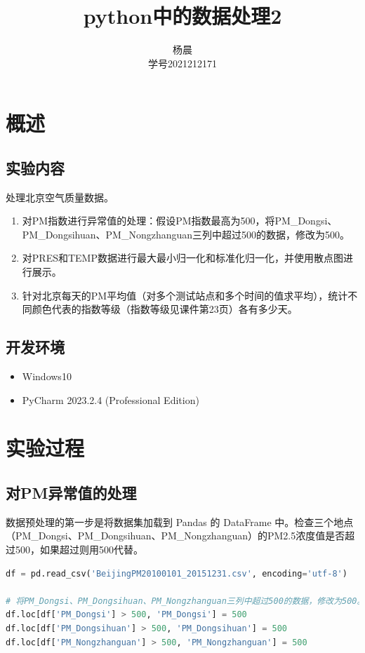 \documentclass[lang=cn,11pt,a4paper]{elegantpaper}
\title{python中的数据处理2}
\author{杨晨 \\学号2021212171}
\institute{北京邮电大学 计算机学院}
\date{\zhtoday}
\begin{document}
\maketitle

\section{概述}

\subsection{实验内容}

处理北京空气质量数据。

\begin{enumerate}
    \item 对PM指数进行异常值的处理：假设PM指数最高为500，将PM\_Dongsi、PM\_Dongsihuan、PM\_Nongzhanguan三列中超过500的数据，修改为500。 
    \item 对PRES和TEMP数据进行最大最小归一化和标准化归一化，并使用散点图进行展示。
    \item 针对北京每天的PM平均值（对多个测试站点和多个时间的值求平均），统计不同颜色代表的指数等级（指数等级见课件第23页）各有多少天。
\end{enumerate}

\subsection{开发环境}

\begin{itemize}
    \item Windows10
    \item PyCharm 2023.2.4 (Professional Edition)
\end{itemize}

\section{实验过程}

\subsection{对PM异常值的处理}
数据预处理的第一步是将数据集加载到 Pandas 的 DataFrame 中。检查三个地点（PM\_Dongsi、PM\_Dongsihuan、PM\_Nongzhanguan）的PM2.5浓度值是否超过500，如果超过则用500代替。
\begin{lstlisting}[language=python]
df = pd.read_csv('BeijingPM20100101_20151231.csv', encoding='utf-8')

# 将PM_Dongsi、PM_Dongsihuan、PM_Nongzhanguan三列中超过500的数据，修改为500。
df.loc[df['PM_Dongsi'] > 500, 'PM_Dongsi'] = 500
df.loc[df['PM_Dongsihuan'] > 500, 'PM_Dongsihuan'] = 500
df.loc[df['PM_Nongzhanguan'] > 500, 'PM_Nongzhanguan'] = 500
\end{lstlisting}
\end{document}
